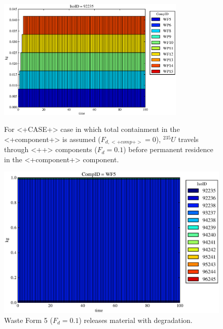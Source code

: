 \begin{figure}[ht]
\centering
\includegraphics[width=0.8\textwidth]{./chapters/demonstration/no_release/lpPFMII.eps}
\caption[$^{235}U$ residence. Lumped Parameter  <+Component+> No Release.]{
For <+CASE+> case in which total containment in the <+component+> is assumed 
($F_{d,<+comp+>}=0$), $^{235}U$ travels through <++> components ($F_d = 0.1$) before 
permanent residence in the <+component+> component.
}
\label{fig:lpPFMIIall}
\begin{minipage}[b]{0.45\linewidth}

  \includegraphics[width=\textwidth]{./chapters/demonstration/no_release/lpPFMII1.eps}
  \caption[LPPFMII Waste Form Contaminants.]{
    Waste Form 5 ($F_d = 0.1$) releases material with degradation. 
    }
  \label{fig:lpPFMIIwf5}
  

\end{minipage}
\end{figure}
